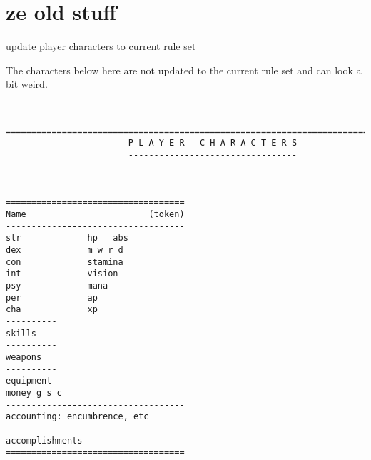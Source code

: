 \clearpage
{}
\section*{ze old stuff}

\todo update player characters to current rule set

The characters below here are not updated to the current rule set and can look a bit weird.



\


\goodbreak
\tiny \begin{samepage} \begin{verbatim}
================================================================================
                        P L A Y E R   C H A R A C T E R S
                        ---------------------------------



===================================
Name                        (token)
-----------------------------------
str             hp   abs
dex             m w r d
con             stamina
int             vision
psy             mana
per             ap
cha             xp
----------
skills
----------
weapons
----------
equipment
money g s c
-----------------------------------
accounting: encumbrence, etc
-----------------------------------
accomplishments
===================================
\end{verbatim} \end{samepage} \normalsize


\

